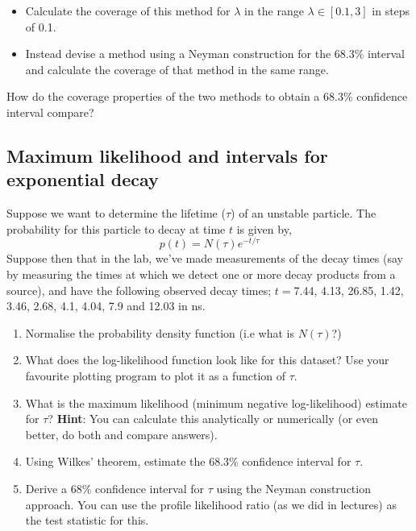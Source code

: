 \begin{itemize}
    \item Calculate the coverage of this method for $\lambda$ in the range $\lambda\in[0.1,3]$ in steps of 0.1.
    \item Instead devise a method using a Neyman construction for the 68.3\% interval and calculate the coverage of that method in the same range.
\end{itemize}    

How do the coverage properties of the two methods to obtain a 68.3\% confidence interval compare?


\subsection{Maximum likelihood and intervals for exponential decay}

Suppose we want to determine the lifetime ($\tau$) of an unstable particle. The probability for this particle to decay at time $t$ is given by, 
\begin{equation}
    p(t) = N(\tau)e^{-t/\tau}
\end{equation}
Suppose then that in the lab, we've made measurements of the decay times (say by measuring the times at which we detect one or more decay products from a source), and have the following observed decay times; $t=$7.44, 4.13, 26.85, 1.42, 3.46, 2.68, 4.1, 4.04, 7.9 and 12.03 in ns.

\begin{enumerate}
\item Normalise the probability density function (i.e what is $N(\tau)$?)

\item What does the log-likelihood function look like for this dataset? Use your favourite plotting program to plot it as a function of $\tau$.  

\item What is the maximum likelihood (minimum negative log-likelihood) estimate for $\tau$? \textbf{Hint}: You can calculate this analytically or numerically (or even better, do both and compare answers).

\item Using Wilkes' theorem, estimate the 68.3\% confidence interval for $\tau$.

\item Derive a 68\% confidence interval for $\tau$ using the Neyman construction approach. You can use the profile likelihood ratio (as we did in lectures) as the test statistic for this. 

\end{enumerate}

